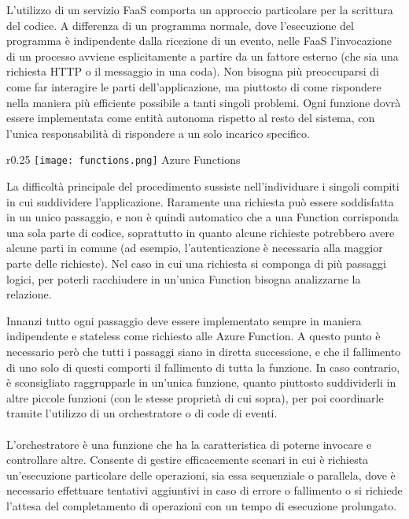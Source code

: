 L'utilizzo di un servizio FaaS
comporta un approccio particolare per la scrittura del codice.
A differenza di un programma normale,
dove l'esecuzione del programma è indipendente dalla ricezione di un evento,
nelle FaaS l'invocazione di un processo avviene esplicitamente a partire da un fattore esterno
(che sia una richiesta HTTP o il messaggio in una coda).
Non bisogna più preoccuparsi di come far interagire le parti dell'applicazione,
ma piuttosto di come rispondere nella maniera più efficiente possibile a tanti singoli problemi.
Ogni funzione dovrà essere implementata come entità autonoma rispetto al resto del sistema,
con l'unica responsabilità di rispondere a un solo incarico specifico.\\
\begin{wrapfigure}{r}{0.25\textwidth}
    \centering
    \texttt{[image: functions.png]}
    Azure Functions
\end{wrapfigure}
La difficoltà principale del procedimento sussiste nell'individuare i singoli compiti
in cui suddividere l'applicazione.
Raramente una richiesta può essere soddisfatta in un unico passaggio,
e non è quindi automatico che a una Function corrisponda una sola parte di codice,
soprattutto in quanto alcune richieste potrebbero avere alcune parti in comune
(ad esempio, l'autenticazione è necessaria alla maggior parte delle richieste).
Nel caso in cui una richiesta si componga di più passaggi logici,
per poterli racchiudere in un'unica Function bisogna analizzarne la relazione.\\
\par
Innanzi tutto ogni passaggio deve essere implementato
sempre in maniera indipendente e stateless come richiesto alle Azure Function.
A questo punto è necessario però che tutti i passaggi siano in diretta successione,
e che il fallimento di uno solo di questi comporti il fallimento di tutta la funzione.
In caso contrario, è sconsigliato raggrupparle in un'unica funzione,
quanto piuttosto suddividerli in altre piccole funzioni
(con le stesse proprietà di cui sopra),
per poi coordinarle tramite l'utilizzo di un orchestratore o di code di eventi.\\
\\
L'orchestratore è una funzione che ha la caratteristica
di poterne invocare e controllare altre.
Consente di gestire efficacemente scenari
in cui è richiesta un'esecuzione particolare delle operazioni, sia essa sequenziale o parallela,
dove è necessario effettuare tentativi aggiuntivi in caso di errore o fallimento o
si richiede l'attesa del completamento di operazioni con un tempo di esecuzione prolungato.
